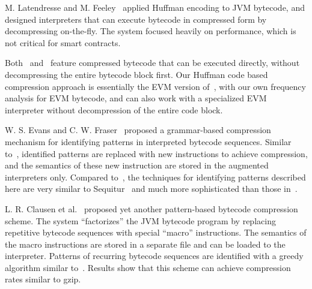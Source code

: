 M. Latendresse and M. Feeley~\cite{marc2003} applied Huffman encoding to JVM bytecode, and designed interpreters that
can execute bytecode in compressed form by decompressing on-the-fly.
The system focused heavily on performance, which is not critical for \eth{} smart contracts.

Both~\cite{aslam2010} and~\cite{marc2003} feature compressed bytecode that can be executed directly, without decompressing
the entire bytecode block first. Our Huffman code based compression approach is essentially the EVM version of~\cite{marc2003},
with our own frequency analysis for EVM bytecode, and can also work with a specialized
EVM interpreter without decompression of the entire code block.

W. S. Evans and C. W. Fraser~\cite{evans2003} proposed a grammar-based compression mechanism for identifying patterns in
interpreted bytecode sequences.
Similar to~\cite{aslam2010}, identified patterns are replaced with new instructions to achieve compression, and the semantics
of these new instruction are stored in the augmented interpreters only. Compared to~\cite{aslam2010}, the techniques for
identifying patterns described here are very similar to Sequitur~\cite{nevill1997linear} and much more sophisticated
than those in~\cite{aslam2010}.

L. R. Clausen et al.~\cite{clausen2000} proposed yet another pattern-based bytecode compression scheme. The system ``factorizes''
the JVM bytecode program by replacing repetitive bytecode sequences with special ``macro'' instructions. The semantics of the
macro instructions are stored in a separate file and can be loaded to the interpreter. Patterns of recurring bytecode sequences
are identified with a greedy algorithm similar to~\cite{aslam2010}. Results show that this scheme can achieve compression rates
similar to gzip.

